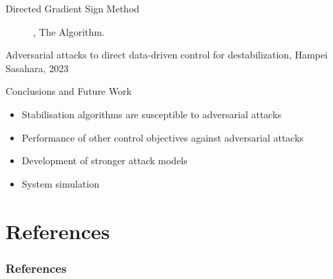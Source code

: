 \documentclass[aspectratio=169, handout, 10pt, hyperref=colorlinks]{beamer}
\begin{document}
\begin{frame}[allowframebreaks]{Directed Gradient Sign Method}
\begin{figure}[H]
\caption{\cite{10383531}, The Algorithm.}
\end{figure}
\begin{center}
\tiny{Adversarial attacks to direct data-driven control for destabilization, Hampei Sasahara, 2023}
\end{center}
\end{frame}
\begin{frame}{Conclusions and Future Work}
        \begin{itemize}
            \item Stabilisation algorithms are susceptible to adversarial attacks
            \item Performance of other control objectives against adversarial attacks
            \item Development of stronger attack models
            \item System simulation
        \end{itemize}
\end{frame}
\section{References}
\begin{frame}[allowframebreaks]
  \frametitle<presentation>{References}
%       

  {}
    

 
    

\end{frame}
\end{document}

